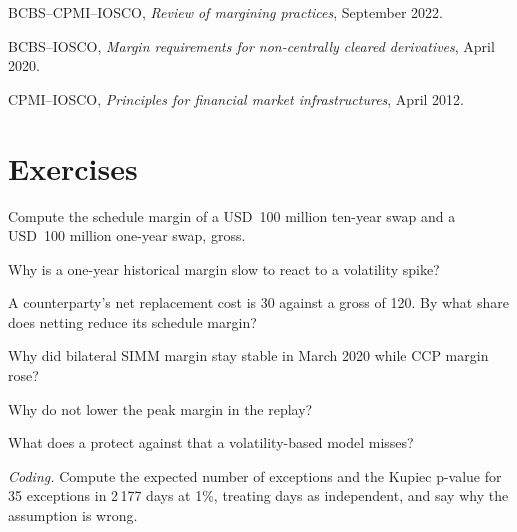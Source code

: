 \begin{omsources}
\item BCBS--CPMI--IOSCO, \emph{Review of margining practices}, September 2022.
\item BCBS--IOSCO, \emph{Margin requirements for non-centrally cleared derivatives}, April 2020.
\item CPMI--IOSCO, \emph{Principles for financial market infrastructures}, April 2012.
\end{omsources}

\section{Exercises}

\begin{exercise}[$\star$]\label{exo:rc:margin-models:1}
Compute the schedule margin of a USD~100 million ten-year swap and a USD~100 million one-year swap,
gross.
\end{exercise}

\begin{exercise}[$\star$]\label{exo:rc:margin-models:2}
Why is a one-year historical margin slow to react to a volatility spike?
\end{exercise}

\begin{exercise}[$\star$]\label{exo:rc:margin-models:3}
A counterparty's net replacement cost is 30 against a gross of 120. By what share does netting reduce
its schedule margin?
\end{exercise}

\begin{exercise}[$\star\star$]\label{exo:rc:margin-models:4}
Why did bilateral SIMM margin stay stable in March 2020 while CCP margin rose?
\end{exercise}

\begin{exercise}[$\star\star$]\label{exo:rc:margin-models:5}
Why do  not lower the peak margin in the replay?
\end{exercise}

\begin{exercise}[$\star\star$]\label{exo:rc:margin-models:6}
What does a  protect against that a volatility-based model misses?
\end{exercise}

\begin{exercise}[$\star\star\star$]\label{exo:rc:margin-models:7}
\emph{Coding.} Compute the expected number of exceptions and the Kupiec p-value for 35 exceptions in
2\,177 days at 1\%, treating days as independent, and say why the assumption is wrong.
\end{exercise}

